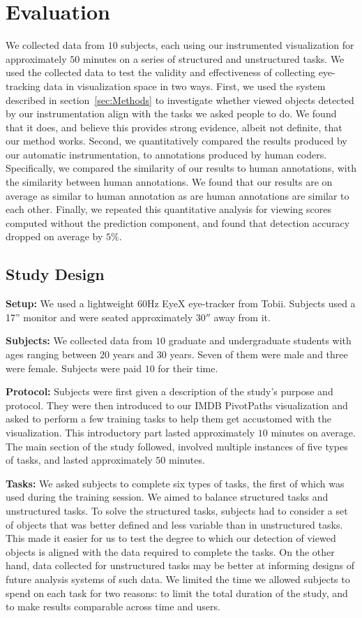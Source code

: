 \section{Evaluation}
We collected data from $10$ subjects, each using our instrumented visualization for approximately $50$ minutes on a series of structured and unstructured tasks. We used the collected data to test the validity and effectiveness of collecting eye-tracking data in visualization space in two ways. First, we used the system described in section~\ref{sec:Methods} to investigate whether viewed objects detected by our instrumentation align with the tasks we asked people to do. We found that it does, and believe this provides strong evidence, albeit not definite, that our method works. Second, we quantitatively compared the results produced by our automatic instrumentation, to annotations produced by human coders. Specifically, we compared the similarity of our results to human annotations, with the similarity between human annotations. We found that our results are on average as similar to human annotation as are human annotations are similar to each other. Finally, we repeated this quantitative analysis for viewing scores computed without the prediction component, and found that detection accuracy dropped on average by $5\%$. 

\subsection{Study Design }

\textbf{Setup: } We used a lightweight $60$Hz EyeX eye-tracker from Tobii. Subjects used a 17'' monitor and were seated approximately $30''$ away from it.

\textbf{Subjects:} We collected data from $10$ graduate and undergraduate students with ages ranging between $20$ years and $30$ years. Seven of them were male and three were female. Subjects were paid $10$ for their time.

\textbf{Protocol:} Subjects were first given a description of the study's purpose and protocol. They were then introduced to our IMDB PivotPaths visualization and asked to perform a few training tasks to help them get accustomed with the visualization. This introductory part lasted approximately $10$ minutes on average. The main section of the study followed, involved multiple instances of five types of tasks, and lasted approximately $50$ minutes. 


\textbf{Tasks:} We asked subjects to complete six types of tasks, the first of which was used during the training session. We aimed to balance structured tasks and unstructured tasks. To solve the structured tasks, subjects had to consider a set of objects that was better defined and less variable than in unstructured tasks. This made it easier for us to test the degree to which our detection of viewed objects is aligned with the data required to complete the tasks. On the other hand, data collected for unstructured tasks may be better at informing designs of future analysis systems of such data. We limited the time we allowed subjects to spend on each task for two reasons: to limit the total duration of the study, and to make results comparable across time and users.

